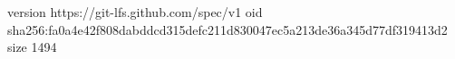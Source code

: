 version https://git-lfs.github.com/spec/v1
oid sha256:fa0a4e42f808dabddcd315defc211d830047ec5a213de36a345d77df319413d2
size 1494
